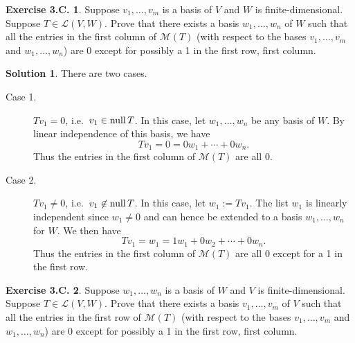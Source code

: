 \documentclass[12pt]{article}
\theoremstyle{definition}
\theoremstyle{exercise}
\newtheorem{exercise}{Exercise 3.C.}
\theoremstyle{solution}
\newtheorem*{solution}{Solution}
\newcommand{\lmap}{\mathcal{L}}
\newcommand{\mat}{\mathcal{M}}
\newcommand{\Null}{\text{null\,}}
\begin{document}
\begin{exercise}
\label{ex:4}
    Suppose \( v_1, \ldots, v_m \) is a basis of \( V \) and \( W \) is finite-dimensional. Suppose \( T \in \lmap(V, W) \). Prove that there exists a basis \( w_1, \ldots, w_n \) of \( W \) such that all the entries in the first column of \( \mat(T) \) (with respect to the bases \( v_1, \ldots, v_m\) and \( w_1, \ldots, w_n \)) are 0 except for possibly a 1 in the first row, first column.

\end{exercise}

\begin{solution}
    There are two cases.
    \begin{description}
        \item[Case 1.] \( Tv_1 = 0 \), i.e.\ \( v_1 \in \Null T \). In this case, let \( w_1, \ldots, w_n \) be any basis of \( W \). By linear independence of this basis, we have
        \[
            Tv_1 = 0 = 0 w_1 + \cdots + 0 w_n.  
        \]
        Thus the entries in the first column of \( \mat(T) \) are all 0.

        \item[Case 2.] \( Tv_1 \neq 0 \), i.e.\ \( v_1 \not\in \Null T \). In this case, let \( w_1 := Tv_1 \). The  list \( w_1 \) is linearly independent since \( w_1 \neq 0 \) and can hence be extended to a basis \( w_1, \ldots, w_n \) for \( W \). We then have
        \[
            Tv_1 = w_1 = 1 w_1 + 0 w_2 + \cdots + 0 w_n.
        \]
        Thus the entries in the first column of \( \mat(T) \) are all 0 except for a 1 in the first row.
    \end{description}
\end{solution}

\begin{exercise}
\label{ex:5}
    Suppose \( w_1, \ldots, w_n \) is a basis of \( W \) and \( V \) is finite-dimensional. Suppose \( T \in \lmap(V, W) \). Prove that there exists a basis \( v_1, \ldots, v_m \) of \( V \) such that all the entries in the first row of \( \mat(T) \) (with respect to the bases \( v_1, \ldots, v_m \) and \( w_1, \ldots, w_n \)) are 0 except for possibly a 1 in the first row, first column.

\end{exercise}
\end{document}
